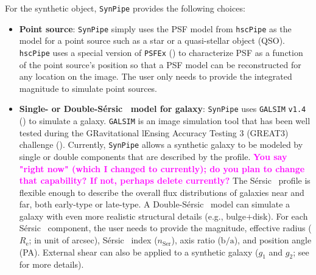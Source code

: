 \documentclass[useamsfonts]{pasj01}
\def\ser{{S\'{e}rsic\ }}
\def\hscpipe{\texttt{hscPipe}}
\def\synpipe{\texttt{SynPipe}}
\def\galsim{\texttt{G}{\scriptsize \texttt{AL}}\texttt{S}{\scriptsize \texttt{IM}}}
\newcommand{\susan}[1]{\textcolor{magenta} {\textbf{#1}}}
\begin{document}
    For the synthetic object, \synpipe{} provides the following choices:

    \begin{itemize}

        \item \textbf{Point source}:
            \synpipe{} simply uses the PSF model from \hscpipe{} as the model for
            a point source such as a star or a quasi-stellar object (QSO).
            \hscpipe{} uses a special version of \texttt{PSFEx}
            (\citealt{Bertin2011, Bertin2013}) to characterize PSF as a function
            of the point source's position so that a PSF model can be reconstructed for any location
            on the image.
           The user only needs to provide the integrated magnitude to simulate
            point sources.

        \item \textbf{Single- or Double-\ser{} model for galaxy}:
            \texttt{SynPipe} uses \galsim{} \texttt{v1.4} (\citealt{Rowe2015}) to
            simulate a galaxy.
            \galsim{} is an image simulation tool that has been well tested during
            the GRavitational lEnsing Accuracy Testing 3 (GREAT3) challenge 
            (\citealt{Mandelbaum2014}).
           Currently, \synpipe{} allows a synthetic galaxy to be modeled by single
            or double components that are described by the \citet{Sersic1963}
            profile. \susan{You say "right now" (which I changed to currently); do you plan to change that capability? If not, perhaps delete currently?}
            The \ser{} profile is flexible enough to describe the overall flux
            distributions of galaxies near and far, both early-type or late-type.
            A Double-\ser{} model can simulate a galaxy with even more realistic
            structural details (e.g., bulge$+$disk).
            For each \ser{} component, the user needs to provide the magnitude,
            effective radius ($R_{\mathrm{e}}$; in unit of arcsec), \ser{} index
            ($n_{\mathrm{Ser}}$), axis ratio ($\mathrm{b}/\mathrm{a}$), and position
            angle (PA).
            External shear can also be applied to a synthetic galaxy ($g_1$ and $g_2$;
            see \citealt{Rowe2015} for more details).


\end{itemize}
\end{document}
